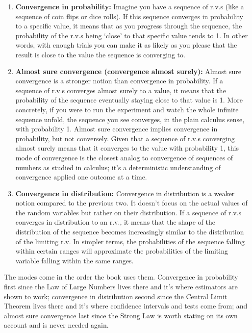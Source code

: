 \begin{enumerate}
\item \textbf{Convergence in probability:}
Imagine you have a sequence of r.v.s (like a sequence of coin flips or dice rolls).
If this sequence converges in probability to a specific value, it means that as you progress through the sequence, the probability of the r.v.s being `close' to that specific value tends to 1.
In other words, with enough trials you can make it as likely as you please that the result is close to the value the sequence is converging to.

\item \textbf{Almost sure convergence (convergence almost surely):}
Almost sure convergence is a stronger notion than convergence in probability.
If a sequence of r.v.s converges almost surely to a value, it means that the probability of the sequence eventually staying close to that value is 1.
More concretely, if you were to run the experiment and watch the whole infinite sequence unfold, the sequence you see converges, in the plain calculus sense, with probability 1.
Almost sure convergence implies convergence in probability, but not conversely.
Given that a sequence of r.v.s converging almost surely means that it converges to the value with probability 1, this mode of convergence is the closest analog to convergence of sequences of numbers as studied in calculus; it's a deterministic understanding of convergence applied one outcome at a time.

\item \textbf{Convergence in distribution:}
Convergence in distribution is a weaker notion compared to the previous two.
It doesn't focus on the actual values of the random variables but rather on their distribution.
If a sequence of r.v.s converges in distribution to an r.v., it means that the shape of the distribution of the sequence becomes increasingly similar to the distribution of the limiting r.v.
In simpler terms, the probabilities of the sequence falling within certain ranges will approximate the probabilities of the limiting variable falling within the same ranges.
\end{enumerate}

The modes come in the order the book uses them. Convergence in probability first since the Law of Large Numbers lives there and it's where estimators are shown to work; convergence in distribution second since the Central Limit Theorem lives there and it's where confidence intervals and tests come from; and almost sure convergence last since the Strong Law is worth stating on its own account and is never needed again.


